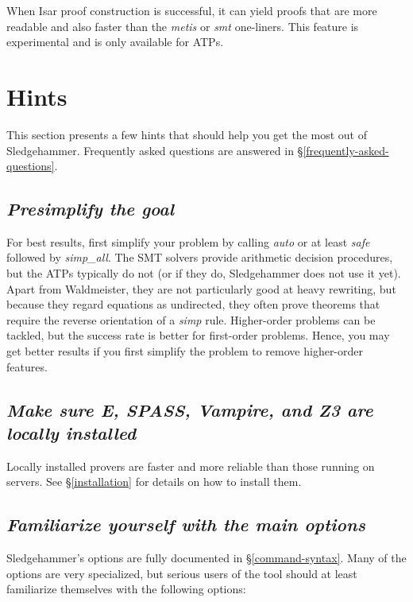 \documentclass[a4paper,12pt]{article}
\begin{document}
When Isar proof construction is successful, it can yield proofs that are more
readable and also faster than the \textit{metis} or \textit{smt} one-liners.
This feature is experimental and is only available for ATPs.

\section{Hints}
\label{hints}

This section presents a few hints that should help you get the most out of
Sledgehammer. Frequently asked questions are answered in
\S\ref{frequently-asked-questions}.

\newcommand\point[1]{\subsection{\emph{#1}}}

\point{Presimplify the goal}

For best results, first simplify your problem by calling \textit{auto} or at
least \textit{safe} followed by \textit{simp\_all}. The SMT solvers provide
arithmetic decision procedures, but the ATPs typically do not (or if they do,
Sledgehammer does not use it yet). Apart from Waldmeister, they are not
particularly good at heavy rewriting, but because they regard equations as
undirected, they often prove theorems that require the reverse orientation of a
\textit{simp} rule. Higher-order problems can be tackled, but the success rate
is better for first-order problems. Hence, you may get better results if you
first simplify the problem to remove higher-order features.

\point{Make sure E, SPASS, Vampire, and Z3 are locally installed}

Locally installed provers are faster and more reliable than those running on
servers. See \S\ref{installation} for details on how to install them.

\point{Familiarize yourself with the main options}

Sledgehammer's options are fully documented in \S\ref{command-syntax}. Many of
the options are very specialized, but serious users of the tool should at least
familiarize themselves with the following options:
\end{document}
